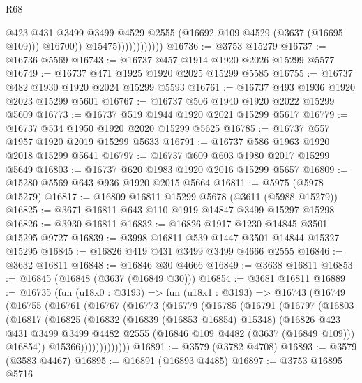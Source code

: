 \begin{lexlean}{R68}
\begin{coremodule}
                                @423
                                @431
                                @3499
                                @3499
                                @4529
                                @2555
                                (@16692 @109 @4529 (@3637 (@16695 @109)))
                                @16700))
                            @15475))))))))))))
@16736 := @3753 @15279
@16737 := @16736 @5569
@16743 := @16737 @457 @1914 @1920 @2026 @15299 @5577
@16749 := @16737 @471 @1925 @1920 @2025 @15299 @5585
@16755 := @16737 @482 @1930 @1920 @2024 @15299 @5593
@16761 := @16737 @493 @1936 @1920 @2023 @15299 @5601
@16767 := @16737 @506 @1940 @1920 @2022 @15299 @5609
@16773 := @16737 @519 @1944 @1920 @2021 @15299 @5617
@16779 := @16737 @534 @1950 @1920 @2020 @15299 @5625
@16785 := @16737 @557 @1957 @1920 @2019 @15299 @5633
@16791 := @16737 @586 @1963 @1920 @2018 @15299 @5641
@16797 := @16737 @609 @603 @1980 @2017 @15299 @5649
@16803 := @16737 @620 @1983 @1920 @2016 @15299 @5657
@16809 := @15280 @5569 @643 @936 @1920 @2015 @5664
@16811 := @5975 (@5978 @15279)
@16817 := @16809 @16811 @15299 @5678 (@3611 (@5988 @15279))
@16825 := @3671 @16811 @643 @110 @1919 @14847 @3499 @15297 @15298
@16826 := @3930 @16811
@16832 := @16826 @1917 @1230 @14845 @3501 @15295 @9727
@16839 := @3998 @16811 @539 @1447 @3501 @14844 @15327 @15295
@16845 := @16826 @419 @431 @3499 @3499 @4666 @2555
@16846 := @3632 @16811
@16848 := @16846 @30 @4666
@16849 := @3638 @16811
@16853 := @16845 (@16848 (@3637 (@16849 @30)))
@16854 := @3681 @16811
@16889 := @16735
    (fun (u18x0 : @3193) =>
    fun (u18x1 : @3193) =>
    @16743
      (@16749
        (@16755
          (@16761
            (@16767
              (@16773
                (@16779
                  (@16785
                    (@16791
                      (@16797
                        (@16803
                          (@16817
                            (@16825
                              (@16832
                                (@16839 (@16853 @16854) @15348)
                                (@16826
                                  @423
                                  @431
                                  @3499
                                  @3499
                                  @4482
                                  @2555
                                  (@16846 @109 @4482 (@3637 (@16849 @109)))
                                  @16854))
                              @15366)))))))))))))
@16891 := @3579 (@3782 @4708)
@16893 := @3579 (@3583 @4467)
@16895 := @16891 (@16893 @4485)
@16897 := @3753 @16895 @5716

\end{coremodule}
\end{lexlean}
